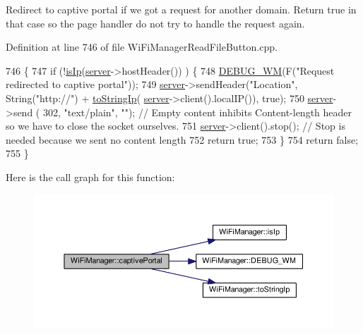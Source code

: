 Redirect to captive portal if we got a request for another domain. Return true in that case so the page handler do not try to handle the request again. 

Definition at line 746 of file Wi\+Fi\+Manager\+Read\+File\+Button.\+cpp.


\begin{DoxyCode}
746                                    \{
747   \textcolor{keywordflow}{if} (!\hyperlink{class_wi_fi_manager_a9c78a8774f746ec22a99d03a53baa607}{isIp}(\hyperlink{class_wi_fi_manager_a509523a01c0395cf0dc235b074f2a5ea}{server}->hostHeader()) ) \{
748     \hyperlink{class_wi_fi_manager_ae5f595c670ccbcf9a191baf50f5c7c26}{DEBUG\_WM}(F(\textcolor{stringliteral}{"Request redirected to captive portal"}));
749     \hyperlink{class_wi_fi_manager_a509523a01c0395cf0dc235b074f2a5ea}{server}->sendHeader(\textcolor{stringliteral}{"Location"}, String(\textcolor{stringliteral}{"http://"}) + \hyperlink{class_wi_fi_manager_a8dfd64cefecbdf26242b16eca335c20b}{toStringIp}(
      \hyperlink{class_wi_fi_manager_a509523a01c0395cf0dc235b074f2a5ea}{server}->client().localIP()), \textcolor{keyword}{true});
750     \hyperlink{class_wi_fi_manager_a509523a01c0395cf0dc235b074f2a5ea}{server}->send ( 302, \textcolor{stringliteral}{"text/plain"}, \textcolor{stringliteral}{""}); \textcolor{comment}{// Empty content inhibits Content-length header so we have
       to close the socket ourselves.}
751     \hyperlink{class_wi_fi_manager_a509523a01c0395cf0dc235b074f2a5ea}{server}->client().stop(); \textcolor{comment}{// Stop is needed because we sent no content length}
752     \textcolor{keywordflow}{return} \textcolor{keyword}{true};
753   \}
754   \textcolor{keywordflow}{return} \textcolor{keyword}{false};
755 \}
\end{DoxyCode}
Here is the call graph for this function\+:\nopagebreak
\begin{figure}[H]
\begin{center}
\leavevmode
\includegraphics[width=350pt]{d4/dc8/class_wi_fi_manager_a4ef4298deb224212e5242c456669a973_cgraph}
\end{center}
\end{figure}
